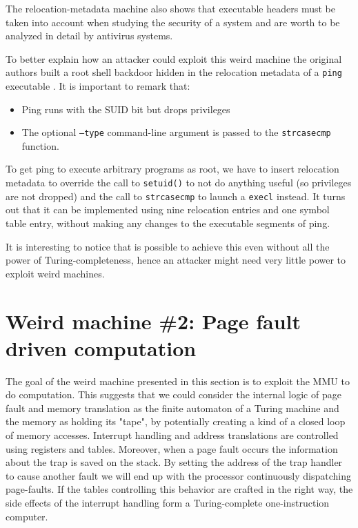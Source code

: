 \documentclass[11pt,twoside,a4paper]{article}
\begin{document}
The relocation-metadata machine also shows that executable headers must be taken into account when studying the security of a system and are worth to be analyzed in detail by antivirus systems.

To better explain how an attacker could exploit this weird machine the original authors built a root shell backdoor hidden in the relocation metadata of a \texttt{ping} executable \cite{ping_elf}. It is important to remark that: 
\begin{itemize}
\item Ping runs with the SUID bit but drops privileges 
\item The optional \texttt{--type} command-line argument is passed to the \texttt{strcasecmp} function.
\end{itemize}

To get ping to execute arbitrary programs as root, we have to insert relocation metadata to override the call to \texttt{setuid()} to not do anything useful (so privileges are not dropped) and the call to \texttt{strcasecmp} to launch a \texttt{execl} instead. It turns out that it can be implemented using nine relocation entries and one symbol table entry, without making any changes to the executable segments of ping.

It is interesting to notice that is possible to achieve this even without all the power of Turing-completeness, hence an attacker might need very little power to exploit weird machines.

\section{Weird machine \#2: Page fault driven computation}
The goal of the weird machine presented in this section is to exploit the MMU to do computation. This suggests that we could consider the internal logic of page fault and memory translation as the finite automaton of a Turing machine and the memory as holding its "tape", by potentially creating a kind of a closed loop of memory accesses.
Interrupt handling and address translations are controlled using registers and tables. Moreover, when a page fault occurs the information about the trap is saved on the stack. By setting the address of the trap handler to cause another fault we will end up with the processor continuously dispatching page-faults. If the tables controlling this behavior are crafted in the right way, the side effects of the interrupt handling form a Turing-complete one-instruction computer.
\end{document}
